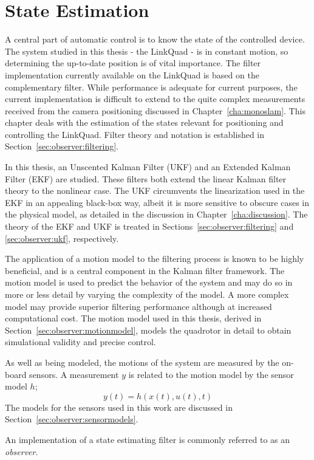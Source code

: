 \chapter{State Estimation}
\label{cha:observer}
    A central part of automatic control is to know the state of the controlled device.
    The system studied in this thesis - the LinkQuad - is in constant
    motion, so determining the up-to-date position is of vital importance.
    The filter implementation currently available on the LinkQuad is
    based on the complementary filter. While performance is adequate for
    current purposes, the current implementation is difficult to extend
    to the quite complex measurements received from the camera positioning
    discussed in Chapter~\ref{cha:monoslam}.
    This chapter deals with the estimation of the states relevant for positioning
    and controlling the LinkQuad.
    Filter theory and notation is established in Section~\ref{sec:observer:filtering}.

    In this thesis, an Unscented Kalman Filter (UKF) and an Extended Kalman Filter (EKF) are studied.
    These filters both extend the linear Kalman filter theory to the nonlinear case.
    The UKF circumvents the linearization used in the EKF in an appealing black-box way,
    albeit it is more sensitive to obscure cases in the physical model,
    as detailed in the discussion in Chapter~\ref{cha:discussion}.
    The theory of the EKF and UKF is treated in
    Sections~\ref{sec:observer:filtering} and \ref{sec:observer:ukf}, respectively.

    The application of a motion model to the filtering process is known to
    be highly beneficial, and is a central component in the Kalman filter framework.
    The motion model is used to predict the behavior of the system and may do
    so in more or less detail by varying the complexity of the model.
    A more complex model may provide superior filtering performance although
    at increased computational cost. The motion model used in this thesis,
    derived in Section~\ref{sec:observer:motionmodel}, models the quadrotor
    in detail to obtain simulational validity and precise control.

    As well as being modeled, the motions of the system are measured by the on-board sensors.
    A measurement $y$ is related to the motion model by the sensor model $h$;
    \begin{equation}
        y(t) = h(x(t),u(t),t)
    \end{equation}
    The models for the sensors used in this work are discussed in Section~\ref{sec:observer:sensormodels}.

    An implementation of a state estimating filter is commonly referred to as an \textit{observer}.

    
    
    
    
